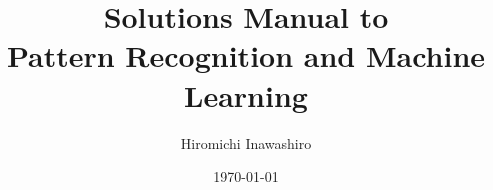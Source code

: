 \documentclass[12pt]{article}
\title{Solutions Manual to \protect\\ Pattern Recognition and Machine Learning}
\author{Hiromichi Inawashiro}
\date{\today}
\numberwithin{equation}{section}
\begin{document}
\maketitle{}

\newpage{}


\end{document}
